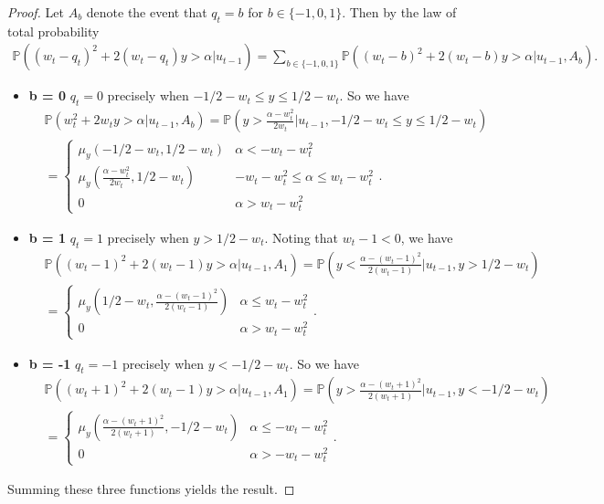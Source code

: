 \documentclass[journal,onecolumn,11pt,final]{IEEEtran}
\newcommand{\1}{\mathbb{1}}
\theoremstyle{plain}
\theoremstyle{definition}
\theoremstyle{plain}
\theoremstyle{plain}
\theoremstyle{definition}
\renewcommand{\P}{\mathbb{P}}
\begin{document}
\begin{proof}
	Let \(A_b\) denote the event that \(q_t = b\) for \(b \in \{-1, 0, 1\}\). Then by the law of total probability
	\begin{align*}
	\P\left( (w_t - q_t)^2 + 2(w_t - q_t)y > \alpha \Big| u_{t-1} \right) = \sum_{b \in \{-1, 0, 1\}} \P\left( (w_t - b)^2 + 2(w_t - b)y > \alpha \Big| u_{t-1}, A_b \right).
	\end{align*}
	\begin{itemize}
		\item \textbf{b = 0} \(q_t = 0\) precisely when \(-1/2 - w_t \leq  y \leq 1/2 - w_t\). So we have
		\begin{align*}
		&\P\left( w_t^2 + 2w_t y > \alpha \Big| u_{t-1}, A_b \right) = \P\left( y > \frac{\alpha-w_t^2}{2w_t} \Big| u_{t-1}, -1/2 - w_t \leq y \leq 1/2-w_t\right) \\
		&=\left \{ \begin{array}{ll}
			      \mu_y\left( -1/2 - w_t, 1/2 - w_t\right) & \alpha < -w_t - w_t^2 \\
			        \mu_y\left( \frac{\alpha-w_t^2}{2w_t}, 1/2 - w_t\right) &  -w_t - w_t^2 \leq \alpha \leq w_t - w_t^2\\
			      0 & \alpha > w_t - w_t^2
			\end{array} .
			\right.  
		\end{align*}
		
		\item \textbf{b = 1} \(q_t = 1\) precisely when \( y > 1/2 - w_t\). Noting that \(w_t - 1 < 0\), we have
		\begin{align*}
		&\P\left( (w_t - 1)^2 + 2(w_t - 1)y > \alpha \Big| u_{t-1}, A_1 \right) = \P\left( y < \frac{\alpha-(w_t - 1)^2}{2(w_t-1)} \Big| u_{t-1}, y > 1/2 - w_t \right) \\		
		&=\left\{ \begin{array}{ll}
			        \mu_y\left( 1/2 - w_t,  \frac{\alpha - (w_t - 1)^2}{2(w_t - 1)} \right) &   \alpha \leq w_t - w_t^2\\
			      0 & \alpha > w_t - w_t^2
			\end{array} .
			\right.  		
			\end{align*}
			
		\item \textbf{b = -1} \(q_t = -1\) precisely when \( y < -1/2 - w_t\). So we have
		\begin{align*}
		&\P\left( (w_t + 1)^2 + 2(w_t - 1)y > \alpha \Big| u_{t-1}, A_1 \right) = \P\left( y > \frac{\alpha-(w_t + 1)^2}{2(w_t+1)} \Big| u_{t-1}, y < -1/2 - w_t \right) \\		
		&=\left\{ \begin{array}{ll}
			        \mu_y\left( \frac{\alpha - (w_t + 1)^2}{2(w_t + 1)}, -1/2 - w_t \right) &   \alpha \leq -w_t - w_t^2\\
			      0 & \alpha > -w_t - w_t^2
			\end{array} .
			\right.  		
			\end{align*}
	\end{itemize}
 	Summing these three functions yields the result.
\end{proof}
\end{document}
